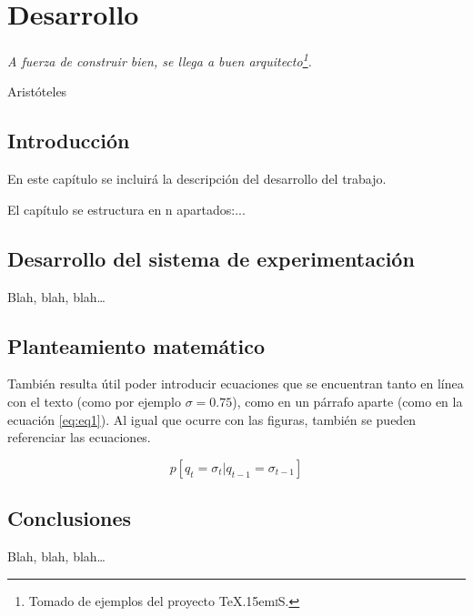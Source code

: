 \documentclass[spanish,openright]{book}
\def\texis{\TeX \raise.15em\hbox{\textsc{i}}S}
\newenvironment{FraseCelebre}{\begin{list}{}{\setlength{\leftmargin}{0.5\textwidth}\setlength{\parsep}{0cm}\addtolength{\topsep}{0.5cm}}
}
{\unskip \end{list}}
\newenvironment{Frase}{\item \begin{flushright}\small\em}{\end{flushright}}
\newenvironment{Fuente}{\item \begin{flushright}\small}{\end{flushright}}
\begin{document}
\chapter{Desarrollo}
\label{cha:desarrollo}


\begin{FraseCelebre}
\begin{Frase}
A fuerza de construir bien, se llega a buen
arquitecto\footnote{Tomado de ejemplos del proyecto \texis{}.}.
\end{Frase}
\begin{Fuente}
Aristóteles
\end{Fuente}
\end{FraseCelebre}

\section{Introducción}
\label{sec:introduccion-desarrollo}

En este capítulo se incluirá la descripción del desarrollo del trabajo.

El capítulo se estructura en n apartados:...


\section{Desarrollo del sistema de experimentación}
\label{sec:desarr-del-sist}

Blah, blah, blah\ldots


\section{Planteamiento matemático}
\label{sec:libr-desarr}

También resulta útil poder introducir ecuaciones que se encuentran tanto
en línea con el texto (como por ejemplo $\sigma=0.75$), como en un
párrafo aparte (como en la ecuación \ref{eq:eq1}). Al igual que ocurre con
las figuras, también se pueden referenciar las ecuaciones.

\begin{equation}
\label{eq:eq1}
p[q_t=\sigma_t|q_{t-1}=\sigma_{t-1}]
\end{equation}

\section{Conclusiones}
\label{sec:conclusiones-desarrollo}

Blah, blah, blah\ldots
\end{document}
